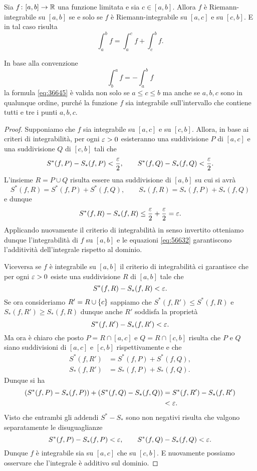 \begin{theorem}
\mymark{*}%
%
%
\label{th:additivita_integrale}%
Sia $f\colon [a,b]\to \mathbb R$ una funzione limitata e sia $c\in [a,b]$.
Allora $f$ è Riemann-integrabile su $[a,b]$ se e solo se
$f$ è Riemann-integrabile su $[a,c]$ e su $[c,b]$.
E in tal caso risulta
\begin{equation}\label{eq:36645}
 \int_a^b f = \int_a^c f + \int_c^b f.
\end{equation}

In base alla convenzione
\[
   \int_b^a f = -\int_a^b f
\]
la formula \eqref{eq:36645} è valida non solo se $a\le c\le b$ ma anche
se $a,b,c$ sono in qualunque ordine, purché la funzione $f$ sia integrabile
sull'intervallo che contiene tutti e tre i punti $a,b,c$.
\end{theorem}
%
\begin{proof}
\mymark{*}
Supponiamo che $f$ sia integrabile su $[a,c]$ e su $[c,b]$.
Allora, in base ai criteri di integrabilità, per ogni $\varepsilon>0$ esisteranno una
suddivisione $P$ di $[a,c]$ e una suddivisione $Q$ di $[c,b]$ tali che
\[
  S^*(f,P) - S_*(f,P) < \frac {\varepsilon} 2,
  \qquad
  S^*(f,Q) - S_*(f,Q) < \frac {\varepsilon} 2.
\]
L'insieme $R=P\cup Q$ risulta essere una suddivisione di $[a,b]$ su cui si avrà
\begin{equation}\label{eq:56632}
S^*(f,R) = S^*(f,P) + S^*(f,Q), \qquad
S_*(f,R) = S_*(f,P) + S_*(f,Q)
\end{equation}
e dunque
\[
S^*(f,R) - S_*(f,R) \le \frac {\varepsilon} 2 + \frac {\varepsilon} 2 = \varepsilon.
\]
Applicando nuovamente il criterio di integrabilità in senso invertito otteniamo
dunque l'integrabilità di $f$ su $[a,b]$ e le equazioni
\eqref{eq:56632} garantiscono l'additività dell'integrale rispetto al dominio.

Viceversa se $f$ è integrabile su $[a,b]$ il criterio di integrabilità
ci garantisce che per ogni $\varepsilon>0$ esiste una suddivisione $R$ di $[a,b]$ tale che
\[
S^*(f,R) - S_*(f,R) < \varepsilon.
\]
Se ora consideriamo $R' = R \cup {\left\{ c \right\}}$ sappiamo che $S^*(f,R') \le S^*(f,R)$
e $S_*(f,R') \ge S_*(f,R)$ dunque anche $R'$ soddisfa la proprietà
\[
S^*(f,R') - S_*(f,R') < \varepsilon.
\]
Ma ora è chiaro che posto $P=R \cap[a,c]$ e $Q=R\cap[c,b]$ risulta che $P$
e $Q$ siano suddivisioni di $[a,c]$ e $[c,b]$ rispettivamente e che
\begin{align*}
  S^*(f,R') &= S^*(f,P) + S^*(f,Q), \\
  S_*(f,R') &= S_*(f,P) + S_*(f,Q).
\end{align*}
Dunque si ha
\begin{align*}
(S^*(f,P) - S_*(f,P)) + (S^*(f,Q) - S_*(f,Q))
&= S^*(f,R') - S_*(f,R') \\
&< \varepsilon.
\end{align*}
Visto che entrambi gli addendi $S^*-S_*$ sono non negativi
risulta che valgono separatamente le disuguaglianze
\[
S^*(f,P) - S_*(f,P) < \varepsilon, \qquad
S^*(f,Q) - S_*(f,Q) < \varepsilon.
\]
Dunque $f$ è integrabile sia su $[a,c]$ che su $[c,b]$.
E nuovamente possiamo osservare che l'integrale è additivo sul dominio.
\end{proof}

